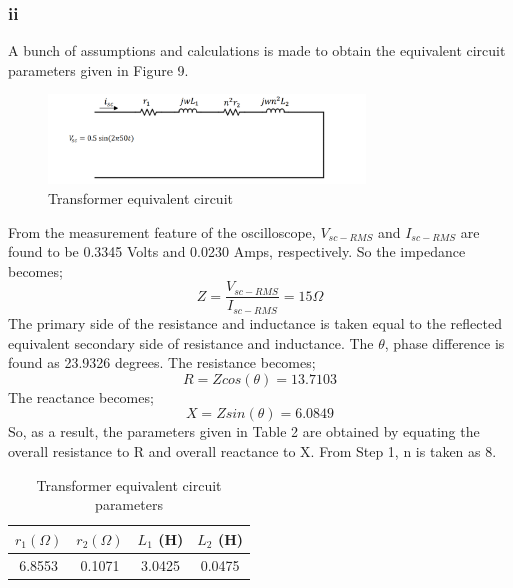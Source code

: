 \documentclass[letterpaper,12pt]{article}
\begin{document}
\subsubsection{ii}
A bunch of assumptions and calculations is made to obtain the equivalent circuit parameters given in Figure 9.
\begin{figure}[H]
    \centering
    \includegraphics[width = 0.75\textwidth]{3.png}
    \caption{Transformer equivalent circuit}
\end{figure} 
From the measurement feature of the oscilloscope, \(V_{sc-RMS}\) and \(I_{sc-RMS}\) are found to be 0.3345 Volts and 0.0230 Amps, respectively. So the impedance becomes;
\[
    Z = \frac{V_{sc-RMS}}{I_{sc-RMS}} = 15 \Omega
    \]
    The primary side of the resistance and inductance is taken equal to the reflected equivalent secondary side of resistance and inductance. The \(\theta\), phase difference is found as 23.9326 degrees. The resistance becomes;
    \[
    R = Z cos (\theta) = 13.7103
    \]
    The reactance becomes;
    \[
    X = Z sin (\theta) = 6.0849 
    \]
    So, as a result, the parameters given in Table 2 are obtained by equating the overall resistance to R and overall reactance to X. From Step 1, n is taken as 8.
    \begin{table}[H]
    \begin{center}
        \caption{Transformer equivalent circuit parameters}
        \vspace{2mm}
        \begin{tabular}{||c | c | c | c ||} 
            \hline
            \(r_1 (\Omega) \) & \(r_2 (\Omega)\)  & \(L_1\) (H) & \(L_2\) (H) \\ [0.5ex] 
            \hline\hline
            6.8553 & 0.1071 & 3.0425 & 0.0475 \\ 
            \hline
        \end{tabular}
    \end{center}
    \end{table}
    

\end{document}
